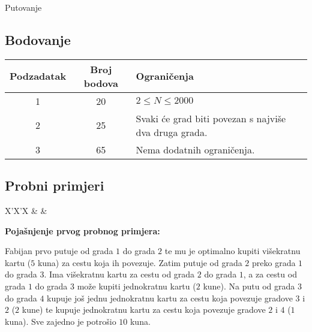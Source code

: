\begin{statement}[
  problempoints=110,
  timelimit=1 sekunda,
  memorylimit=512 MiB,
]{Putovanje}
 \subsection*{Bodovanje}
{\renewcommand{\arraystretch}{1.4}
  \setlength{\tabcolsep}{6pt}
  \begin{tabular}{ccl}
 Podzadatak & Broj bodova & Ograničenja \\ \midrule
  1 & 20 & $2 \le N \le 2000$ \\
  2 & 25 & Svaki će grad biti povezan s najviše dva druga grada. \\
  3 & 65 & Nema dodatnih ograničenja.
\end{tabular}}

\subsection*{Probni primjeri}
\begin{tabularx}{\textwidth}{X'X'X}
 &
 &
\end{tabularx}

\clearpage

\textbf{Pojašnjenje prvog probnog primjera:}

Fabijan prvo putuje od grada $1$ do grada $2$ te mu je optimalno kupiti
višekratnu kartu ($5$ kuna) za cestu koja ih povezuje. Zatim putuje od grada
$2$ preko grada $1$ do grada $3$. Ima višekratnu kartu za cestu od grada $2$ do
grada $1$, a za cestu od grada $1$ do grada $3$ može kupiti jednokratnu kartu
($2$ kune). Na putu od grada $3$ do grada $4$ kupuje još jednu jednokratnu
kartu za cestu koja povezuje gradove $3$ i $2$ ($2$ kune) te kupuje jednokratnu
kartu za cestu koja povezuje gradove $2$ i $4$ ($1$ kuna). Sve zajedno je
potrošio $10$ kuna.

\end{statement}

